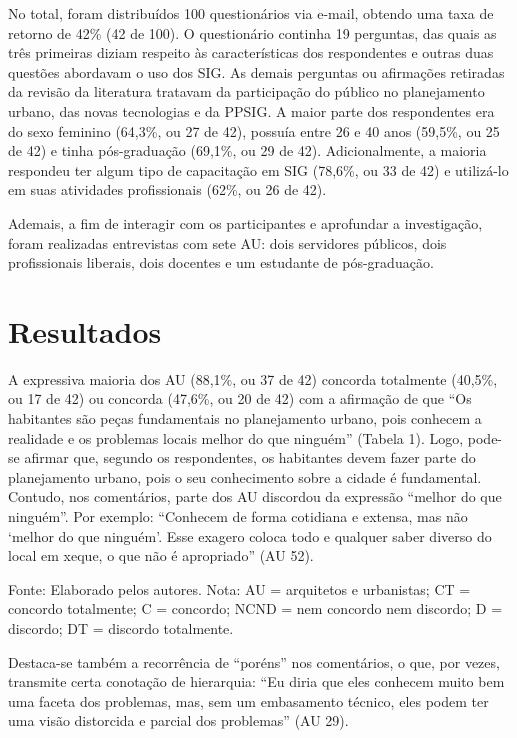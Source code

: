 \documentclass{article}
\begin{document}
\begin{multicols}{2}
No total, foram distribuídos 100 questionários via e-mail, obtendo uma taxa de
retorno de 42\% (42 de 100). O questionário continha 19 perguntas, das quais as
três
primeiras diziam respeito às características dos respondentes e outras duas
questões
abordavam o uso dos SIG. As demais perguntas ou afirmações retiradas da revisão
da
literatura tratavam da participação do público no planejamento urbano, das novas
tecnologias e da PPSIG. A maior parte dos respondentes era do sexo feminino
(64,3\%,
ou 27 de 42), possuía entre 26 e 40 anos (59,5\%, ou 25 de 42) e tinha
pós-graduação
(69,1\%, ou 29 de 42). Adicionalmente, a maioria respondeu ter algum tipo de
capacitação em SIG (78,6\%, ou 33 de 42) e utilizá-lo em suas atividades
profissionais (62\%, ou 26 de 42).

Ademais, a fim de interagir com os participantes e aprofundar a investigação,
foram
realizadas entrevistas com sete AU: dois servidores públicos, dois profissionais
liberais, dois docentes e um estudante de pós-graduação.

\section{Resultados}

A expressiva maioria dos AU (88,1\%, ou 37 de 42) concorda totalmente (40,5\%,
ou
17 de 42) ou concorda (47,6\%, ou 20 de 42) com a afirmação de que “Os
habitantes são peças fundamentais no planejamento urbano, pois conhecem a
realidade e os problemas locais melhor do que ninguém” (Tabela 1). Logo, pode-se
afirmar que,
segundo os respondentes, os habitantes devem fazer parte do planejamento urbano,
pois o seu conhecimento sobre a cidade é fundamental. Contudo, nos comentários,
parte dos AU discordou da expressão “melhor do que ninguém”. Por exemplo:
“Conhecem de forma cotidiana e extensa, mas não ‘melhor do que
ninguém’. Esse exagero coloca todo e qualquer saber diverso do local em
xeque, o que não é apropriado” (AU 52).

Fonte: Elaborado pelos autores. Nota: AU = arquitetos e urbanistas;
CT = concordo totalmente; C = concordo; NCND = nem concordo nem
discordo; D = discordo; DT = discordo totalmente.

Destaca-se também a recorrência de “poréns” nos comentários, o que, por vezes,
transmite certa conotação de hierarquia: “Eu diria que eles conhecem
muito bem uma faceta dos problemas, mas, sem um embasamento técnico, eles
podem ter uma visão distorcida e parcial dos problemas” (AU
29).


\end{multicols}
\end{document}
